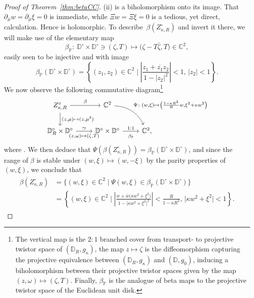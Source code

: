 \documentclass[10pt,a4paper]{amsart}
\numberwithin{equation}{section}
\theoremstyle{definition}
\newcommand{\1}{{\bf 1}}
\newcommand \Cm { \mathbb{C}}
\newcommand \Dm { \mathbb{D}}
\newcommand \zbar { \bar{z}}
\newcommand \mubar {{\bar{\mu}}}
\begin{document}
\begin{proof}[Proof of Theorem~\ref{thm:betaCC}]
(ii)  is a biholomorphism onto its image. That $\partial_{\mubar} w = \partial_{\mubar} \xi = 0$ is immediate, while $\Xi w = \Xi \xi = 0$ is a tedious, yet direct, calculation. Hence  is holomorphic. To describe~$\beta(Z_{\kappa,R}^\circ)$ and invert it there, we will make use of the elementary map
	\[ \beta_{\mathbb{P}} \colon \ \Dm^\circ\times \Dm^\circ\ni (\zeta,T) \mapsto \bigl(\zeta-T\bar{\zeta}, T\bigr) \in \Cm^2, \]
	easily seen to be injective and with image
	\[ \beta_{\mathbb{P}} (\Dm^\circ\times \Dm^\circ) = \left\{ (z_1,z_2) \in \Cm^2 \mid \left| \frac{z_1 + \overline{z_1}z_2}{1-|z_2|^2}\right| <1,\, |z_2|<1 \right\}. \]
	We now observe the following commutative diagram\footnote{The vertical map is the $2:1$ branched cover from transport- to projective twistor space of $(\Dm_R,g_\kappa)$, the map $z\mapsto \zeta$ is the diffeomorphism capturing the projective equivalence between $(\Dm_R,g_\kappa)$ and $(\Dm,g_0)$, inducing a biholomorphism between their projective twistor spaces given by the map $(z,\omega)\mapsto (\zeta,T)$. Finally, $\beta_{\mathbb{P}}$ is the analogue of beta maps to the projective twistor space of the Euclidean unit disk.}
	\[
	 	\begin{tikzcd}
			Z_{\kappa,R}^\circ \arrow["{\beta}"]{r} \arrow["{(z,\mu)\mapsto (z,\mu^2)}"]{d} & \Cm^2 \arrow[dr, bend left, "{\Psi\colon (w,\xi)\mapsto \bigl(\frac{1-\kappa R^2}{R}w, \xi^2 + \kappa w^2\bigr)}"] & {} \\
	 		\Dm_R^\circ \times \Dm^\circ \arrow[r, "\simeq", "{(z,\omega)\mapsto (\zeta,T)}"{yshift=-3ex}] & \Dm^\circ \times \Dm^\circ \arrow[r, "1:1", "{\beta_{\mathbb{P}}}"{yshift=-3ex}] & \Cm^2,
	 	\end{tikzcd}
	\]
	where \smash{$(\zeta,T) = \bigl(\frac{1-\kappa R^2}{1-\kappa |z|^2} \frac{z}{R}, \frac{\kappa z^2 + \omega}{1+\kappa\zbar^2 \omega}\bigr)$}. We then deduce that $\Psi(\beta(Z_{\kappa,R}^\circ)) = \beta_{\mathbb{P}}(\Dm^\circ\times \Dm^\circ)$, and since the range of $\beta$ is stable under $(w,\xi)\mapsto (w,-\xi)$ by the parity properties of $(w,\xi)$, we conclude that
	\begin{align*}
		\begin{split}
			\beta(Z_{\kappa,R}^\circ) &= \big\{(w,\xi)\in \Cm^2 \mid \Psi(w,\xi)\in \beta_{\mathbb{P}} (\Dm^\circ\times \Dm^\circ)\big\}	 \\
			&= \left\{ (w,\xi)\in \Cm^2 \mid \left|\frac{w+\bar{w}\bigl(\kappa w^2 + \xi^2\bigr)}{1-\big|\kappa w^2 + \xi^2\big|^2}\right| < \frac{R}{1-\kappa R^2}, \, \big|\kappa w^2 + \xi^2\big|<1 \right\}.

\end{split}
\end{align*}
\end{proof}
\end{document}
